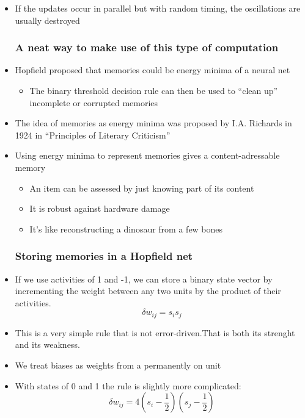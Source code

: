 \begin{itemize}
	\item If the updates occur in parallel but with random timing, the oscillations are usually destroyed
	
	\subsubsection{A neat way to make use of this type of computation}
	\item Hopfield proposed that memories could be energy minima of a neural net
	\begin{itemize}
		\item The binary threshold decision rule can then be used to ``clean up'' incomplete or corrupted memories
	\end{itemize}
	\item The idea of memories as energy minima was proposed by I.A. Richards in 1924 in ``Principles of Literary Criticism''
	\item Using energy minima to represent memories gives a content-adressable memory
	\begin{itemize}
		\item An item can be assessed by just knowing part of its content
		\item It is robust against hardware damage
		\item It's like reconstructing a dinosaur from a few bones
	\end{itemize}

	\subsubsection{Storing memories in a Hopfield net}
	\item If we use activities of 1 and -1, we can store a binary state vector by incrementing the weight between any two units by the product of their activities.
		$$\delta w_{ij} = s_i s_j$$
	\item This is a very simple rule that is not error-driven.That is both its strenght and its weakness. 
	\item We treat biases as weights from a permanently on unit
	\item With states of 0 and 1 the rule is slightly more complicated:
		$$\delta w_{ij} = 4(s_i - \frac{1}{2})(s_j - \frac{1}{2})$$
\end{itemize}